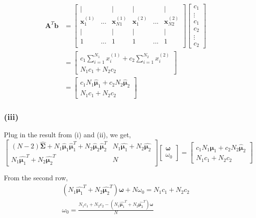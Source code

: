 \documentclass[11pt]{article}
\begin{document}
\begin{equation}
\begin{split}
\pmb{A}^T\pmb{b}&=\begin{bmatrix}
|&&|&|&&|\\
\pmb{x}^{(1)}_1&...&\pmb{x}^{(1)}_{N1}&\pmb{x}^{(2)}_1&...&\pmb{x}^{(2)}_{N2}\\
|&&|&|&&|\\
1&...&1&1&...&1\\
\end{bmatrix}\begin{bmatrix}
c_1\\
\vdots\\
c_1\\
c_2\\
\vdots\\
c_2
\end{bmatrix}\\
&=\begin{bmatrix}
c_1\sum_{i=1}^{N_1}x^{(1)}_i+c_2\sum_{i=1}^{N_2}x^{(2)}_i\\
N_1c_1+N_2c_2
\end{bmatrix}\\
&=\begin{bmatrix}
c_1N_1\hat{\pmb{\mu}}_1+c_2N_2\hat{\pmb{\mu}}_2\\
N_1c_1+N_2c_2
\end{bmatrix}
\end{split}
\end{equation}

\pagebreak
\subsubsection*{(iii)}
Plug in the result from (i) and (ii), we get,
$$\begin{bmatrix}
(N-2)\hat{\pmb{\Sigma}}+N_1\hat{\pmb{\mu}}_1\hat{\pmb{\mu}}_1^T+N_2\hat{\pmb{\mu}}_2\hat{\pmb{\mu}}_2^T & N_1\hat{\pmb{\mu}_1}+N_2\hat{\pmb{\mu}_2}\\
N_1\hat{\pmb{\mu}_1}^T+N_2\hat{\pmb{\mu}_2}^T & N
\end{bmatrix}
\begin{bmatrix}
\pmb{\omega}\\
\omega_0
\end{bmatrix}
=\begin{bmatrix}
c_1N_1\hat{\pmb{\mu}}_1+c_2N_2\hat{\pmb{\mu}}_2\\
N_1c_1+N_2c_2\end{bmatrix}$$

From the second row, 
\begin{equation}
\begin{split}
\left(N_1\hat{\pmb{\mu}_1}^T+N_2\hat{\pmb{\mu}_2}^T\right)\pmb{\omega} + N\omega_0 = N_1c_1+N_2c_2\\
\omega_0 = \frac{N_1c_1+N_2c_2-\left(N_1\hat{\pmb{\mu}_1}^T+N_2\hat{\pmb{\mu}_2}^T\right)\pmb{\omega}}{N}
\end{split}
\end{equation}
\end{document}
